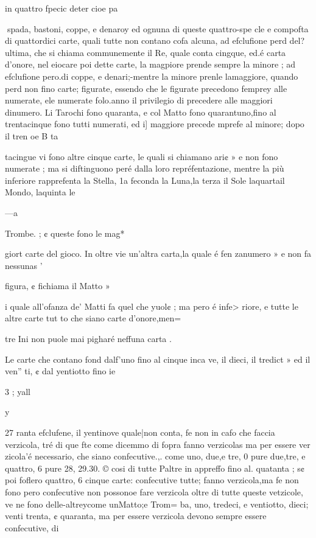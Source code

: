 \documentclass[12pt,a6paper]{article}
\begin{document}
in quattro fpecic deter cioe
pa
 
spada, bastoni, coppe, e denaroy
ed ognuna di queste quattro-spe cle e compofta di quattordici
carte, quali tutte non contano
cofa alcuna, ad efclufione perd
del? ultima, che si chiama communemente il Re, quale conta
cingque, ed.é carta d’onore, nel
eiocare poi dette carte, la magpiore prende sempre la minore ;
ad efclufione pero.di coppe, e
denari;-mentre la minore prenle lamaggiore, quando perd non
fino carte; figurate, essendo che
le figurate precedono femprey
alle numerate, ele numerate
folo.anno il privilegio di precedere alle maggiori dinumero.
Li Tarochi fono quaranta, e
col Matto fono quarantuno,fino
al trentacinque fono tutti numerati, ed i] maggiore precede
mprefe al minore; dopo il tren
oe B ta 

 

 

 

 

tacingue vi fono altre cinque
carte, le quali si chiamano ari¢ »
e non fono numerate ; ma si diftinguono peré dalla loro repréfentazione, mentre la più inferiore rapprefenta la Stella, 1a
feconda la Luna,la terza il Sole
laquartail Mondo, laquinta le

 

—a

Trombe. ; ¢ queste fono le mag*

giort carte del gioco. In oltre
vie un’altra carta,la quale é fen
zanumero » e non fa nessunas '

figura, ¢ fichiama il Matto »

i quale all’ofanza de’ Matti fa
quel che yuol¢ ; ma pero é infe>
riore, e tutte le altre carte tut
to che siano carte d’onore,men=

tre Ini non puole mai pigharé
neffuna carta .

Le carte che contano fond
dalf’uno fino al cinque inca
ve, il dieci, il tredict » ed il ven”
ti, ¢ dal yentiotto fino ie

3 ; yall

y
 

27
ranta efclufene, il yentinove
quale|non conta, fe non in cafo
che faccia verzicola, tré di que
fte come dicemmo di fopra fanno verzicolas ma per essere ver
zicola’é necessario, che siano
confecutive.,. come uno, due,e
tre, 0 pure due,tre, e quattro, 6
pure 28, 29.30. © cosi di tutte
Paltre in appreffo fino al. quatanta ; s¢ poi foflero quattro, 6
cinque carte: confecutive tutte;
fanno verzicola,ma fe non fono
pero confecutive non possonoe
fare verzicola oltre di tutte
queste vetzicole, ve ne fono delle-altreycome unMatto;e Trom=
ba, uno, tredeci, e ventiotto,
dieci; venti trenta, ¢ quaranta,
ma per essere verzicola devono
sempre essere confecutive, di
\end{document}
